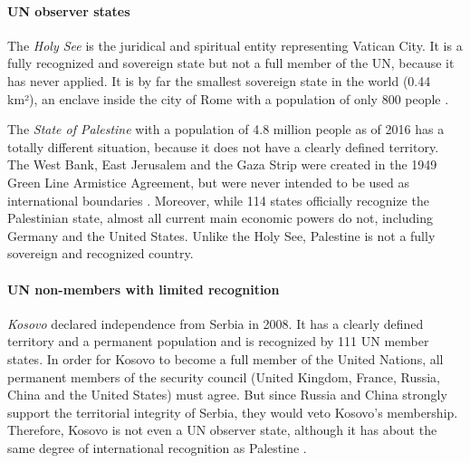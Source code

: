 \paragraph{UN observer states} %
\label{par:un_observer_states}

The \emph{Holy See} is the juridical and spiritual entity representing Vatican City. It is a fully recognized and sovereign state but not a full member of the UN, because it has never applied. It is by far the smallest sovereign state in the world (0.44 km²), an enclave inside the city of Rome with a population of only 800 people \cite{VaticanPopulation}.

The \emph{State of Palestine} with a population of 4.8 million people as of 2016 \cite{PalestinePopulation} has a totally different situation, because it does not have a clearly defined territory. The West Bank, East Jerusalem and the Gaza Strip were created in the 1949 Green Line Armistice Agreement, but were never intended to be used as international boundaries \cite{PalestineTerritory}. Moreover, while 114 states officially recognize the Palestinian state, almost all current main economic powers do not, including Germany and the United States. Unlike the Holy See, Palestine is not a fully sovereign and recognized country.


\paragraph{UN non-members with limited recognition} %
\label{par:un_non_members_with_limited_recognition}

\emph{Kosovo} declared independence from Serbia in 2008. It has a clearly defined territory and a permanent population and is recognized by 111 UN member states. In order for Kosovo to become a full member of the United Nations, all permanent members of the security council (United Kingdom, France, Russia, China and the United States) must agree. But since Russia and China strongly support the territorial integrity of Serbia, they would veto Kosovo's membership. Therefore, Kosovo is not even a UN observer state, although it has about the same degree of international recognition as Palestine \cite{KosovoThanksYou}.

